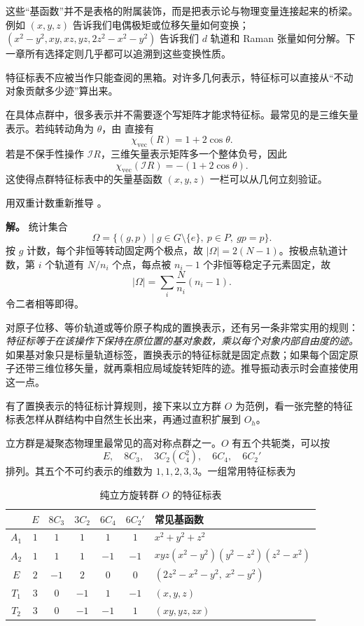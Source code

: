 这些“基函数”并不是表格的附属装饰，而是把表示论与物理变量连接起来的桥梁。例如 $(x,y,z)$ 告诉我们电偶极矩或位移矢量如何变换；$(x^2-y^2,xy,xz,yz,2z^2-x^2-y^2)$ 告诉我们 $d$ 轨道和 Raman 张量如何分解。下一章所有选择定则几乎都可以追溯到这些变换性质。

特征标表不应被当作只能查阅的黑箱。对许多几何表示，特征标可以直接从“不动对象贡献多少迹”算出来。

在具体点群中，很多表示并不需要逐个写矩阵才能求特征标。最常见的是三维矢量表示。若纯转动角为 $\theta$，由  直接有
\[
\chi_{\mathrm{vec}}(R)=1+2\cos\theta.
\]
若是不保手性操作 $\mathcal I R$，三维矢量表示矩阵多一个整体负号，因此
\[
\chi_{\mathrm{vec}}(\mathcal I R)=-(1+2\cos\theta).
\]
这使得点群特征标表中的矢量基函数 $(x,y,z)$ 一栏可以从几何立刻验证。

\begin{workedexample}
用双重计数重新推导 。

\textbf{解。} 统计集合
\[
\Omega=\{(g,p)\mid g\in G\setminus\{e\},\ p\in P,\ gp=p\}.
\]
按 $g$ 计数，每个非恒等转动固定两个极点，故 $|\Omega|=2(N-1)$。按极点轨道计数，第 $i$ 个轨道有 $N/n_i$ 个点，每点被 $n_i-1$ 个非恒等稳定子元素固定，故
\[
|\Omega|=\sum_i\frac{N}{n_i}(n_i-1).
\]
令二者相等即得。
\end{workedexample}


对原子位移、等价轨道或等价原子构成的置换表示，还有另一条非常实用的规则：\emph{特征标等于在该操作下保持在原位置的基对象数，乘以每个对象内部自由度的迹。} 如果基对象只是标量轨道标签，置换表示的特征标就是固定点数；如果每个固定原子还带三维位移矢量，就再乘相应局域旋转矩阵的迹。推导振动表示时会直接使用这一点。

有了置换表示的特征标计算规则，接下来以立方群 $O$ 为范例，看一张完整的特征标表怎样从群结构中自然生长出来，再通过直积扩展到 $O_h$。

立方群是凝聚态物理里最常见的高对称点群之一。$O$ 有五个共轭类，可以按
\[
E,\quad 8C_3,\quad 3C_2(C_4^2),\quad 6C_4,\quad 6C_2'
\]
排列。其五个不可约表示的维数为 $1,1,2,3,3$。一组常用特征标表为

\begin{table}[htbp]
\centering
\caption{纯立方旋转群 $O$ 的特征标表}
\label{tab:o-character}
\begin{tabular}{c|ccccc|l}
\toprule
 & $E$ & $8C_3$ & $3C_2$ & $6C_4$ & $6C_2'$ & 常见基函数 \\
\midrule
$A_1$ & $1$&$1$&$1$&$1$&$1$ & $x^2+y^2+z^2$ \\
$A_2$ & $1$&$1$&$1$&$-1$&$-1$ & $xyz(x^2-y^2)(y^2-z^2)(z^2-x^2)$ \\
$E$   & $2$&$-1$&$2$&$0$&$0$ & $(2z^2-x^2-y^2,\ x^2-y^2)$ \\
$T_1$ & $3$&$0$&$-1$&$1$&$-1$ & $(x,y,z)$ \\
$T_2$ & $3$&$0$&$-1$&$-1$&$1$ & $(xy,yz,zx)$ \\
\bottomrule
\end{tabular}
\end{table}

